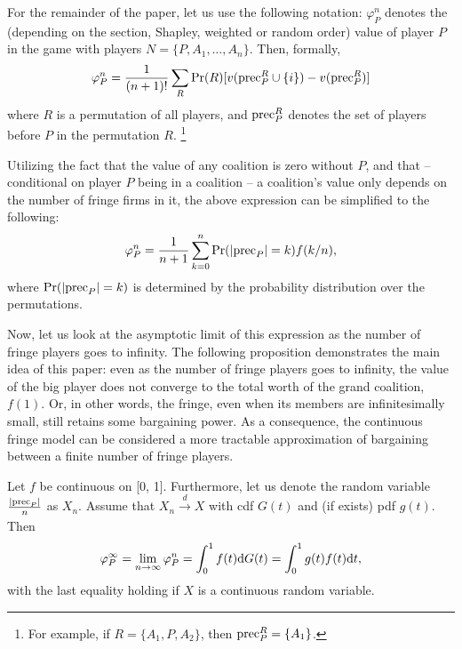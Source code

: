 For the remainder of the paper, let us use the following notation: $\varphi_P^n$ denotes the (depending on the section, Shapley, weighted or random order) value of player $P$ in the game with players $N = \{P, A_1, \dots, A_n\}$.
Then, formally,
\begin{align}
    \varphi_P^n = \frac{1}{(n+1)!} \sum_{R} \Pr(R) [ v(\mathrm{prec}_P^R \cup \{i\}) - v(\mathrm{prec}_P^R) ]  \label{eq:one_sided_general}
\end{align}
where $R$ is a permutation of all players, and $\mathrm{prec}_P^R$ denotes the set of players before $P$ in the permutation $R$. \footnote{
    For example, if $R = \{A_1, P, A_2\}$, then $\mathrm{prec}_P^R = \{A_1\}$.
}

Utilizing the fact that the value of any coalition is zero without $P$, and that -- conditional on player $P$ being in a coalition -- a coalition's value only depends on the number of fringe firms in it, the above expression can be simplified to the following:
\begin{align*}
    \varphi_P^n = \frac{1}{n+1} \sum_{k=0}^n \Pr(|\mathrm{prec}_P| = k) f(k/n),
\end{align*}
where $\Pr(|\mathrm{prec}_P| = k)$ is determined by the probability distribution over the permutations.

Now, let us look at the asymptotic limit of this expression as the number of fringe players goes to infinity.
The following proposition demonstrates the main idea of this paper: even as the number of fringe players goes to infinity, the value of the big player does not converge to the total worth of the grand coalition, $f(1)$.
Or, in other words, the fringe, even when its members are infinitesimally small, still retains some bargaining power.
As a consequence, the continuous fringe model can be considered a more tractable approximation of bargaining between a finite number of fringe players.

\begin{theorem}
    \label{prop:one_sided_general}
    Let $f$ be continuous on [0, 1]. Furthermore, let us denote the random variable $\frac{|\mathrm{prec}_P|}{n}$ as $X_n$. Assume that $X_n \xrightarrow[]{d} X$ with cdf $G(t)$ and (if exists) pdf $g(t)$.
    Then
    \begin{align*}
        \varphi_P^\infty = \lim_{n \to \infty} \varphi_P^n = \int_0^1 f(t) \mathrm{d}G(t) = \int_0^1 g(t) f(t) \mathrm{d}t,
    \end{align*}
    with the last equality holding if $X$ is a continuous random variable.
\end{theorem}

